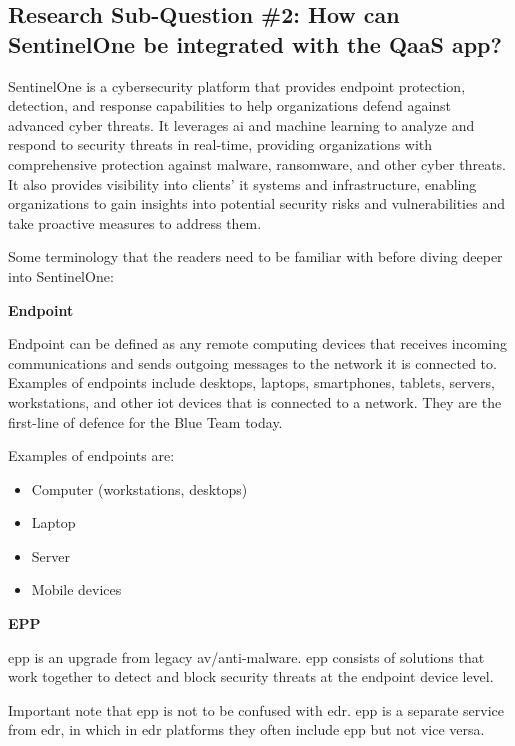 \begin{multicols}{2}
      \section{Research Sub-Question \#2: How can SentinelOne be integrated with the QaaS app?}

      SentinelOne is a cybersecurity platform that provides endpoint protection, detection, and response capabilities to
      help organizations defend against advanced cyber threats. It leverages \acrlong{ai} and machine learning to analyze
      and respond to security threats in real-time, providing organizations with comprehensive protection against malware,
      ransomware, and other cyber threats. It also provides visibility into clients' \acrshort{it} systems and infrastructure,
      enabling organizations to gain insights into potential security risks and vulnerabilities and take proactive measures
      to address them.

      Some terminology that the readers need to be familiar with before diving deeper into SentinelOne:

      \textbf{Endpoint}

      Endpoint can be defined as any remote computing devices that receives incoming communications and sends outgoing messages
      to the network it is connected to. Examples of endpoints include desktops, laptops, smartphones, tablets, servers, workstations,
      and other \acrshort{iot} devices that is connected to a network. They are the first-line of defence for the Blue Team today.

      Examples of endpoints are:
      \begin{itemize}
            \item Computer (workstations, desktops)
            \item Laptop
            \item Server
            \item Mobile devices
      \end{itemize}

      \textbf{EPP}

      \acrshort{epp} is an upgrade from legacy \acrshort{av}/anti-malware. \acrshort{epp} consists of solutions that work together to detect
      and block security threats at the endpoint device level.

      Important note that \acrshort{epp} is not to be confused with \acrshort{edr}. \acrshort{epp} is a separate service from \acrshort{edr},
      in which in \acrshort{edr} platforms they often include \acrshort{epp} but not vice versa.


\end{multicols}
